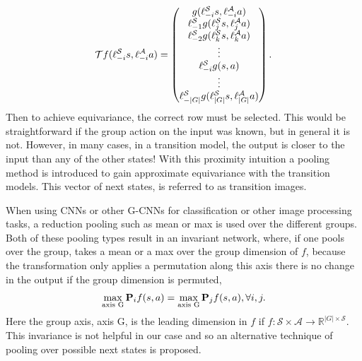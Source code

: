 \begin{equation}\label{eq:g-cnn}
	\mathbf{\mathcal{T}}f(\ell_{-i}^\mathcal{S}s,\ell_{-i}^\mathcal{A}a) = \begin{pmatrix}
		g(\ell_{-i}^\mathcal{S}s,\ell_{-i}^\mathcal{A}a)                 \\
		\ell_{-1}^\mathcal{S}g(\ell_j^\mathcal{S}s,\ell^\mathcal{A}_ja)  \\
		\ell_{-2}^\mathcal{S}g(\ell^\mathcal{S}_ks, \ell^\mathcal{A}_ka) \\
		\vdots                                                           \\
		\ell_{-i}^\mathcal{S}g(s, a)                                     \\
		\vdots                                                           \\
		\ell_{-|G|}^\mathcal{S}g(\ell_{|G|}^\mathcal{S}s, \ell^\mathcal{A}_{|G|}a)
	\end{pmatrix}.
\end{equation}
Then to achieve equivariance, the correct row must be selected. This would be straightforward if the group action on the input was known, but in general it is not. However, in many cases, in a transition model, the output is closer to the input than any of the other states! With this proximity intuition a pooling method is introduced to gain approximate equivariance with the transition models. This vector of next states, is referred to as transition images.

When using CNNs or other G-CNNs for classification or other image processing tasks, a reduction pooling such as mean or max is used over the different groups. Both of these pooling types result in an invariant network, where, if one pools over the group, takes a mean or a max over the group dimension of $f$, because the transformation only applies a permutation along this axis there is no change in the output if the group dimension is permuted,
\begin{equation}
	\max_\text{axis G} \mathbf{P}_i f(s, a) = \max_\text{axis G} \mathbf{P}_j f(s, a), \forall i, j.
\end{equation}
Here the group axis, axis G, is the leading dimension in $f$ if $f: \mathcal{S} \times \mathcal{A} \rightarrow \mathbb{R}^{|G| \times \mathcal{S}}$. This invariance is not helpful in our case and so an alternative technique of pooling over possible next states is proposed.


